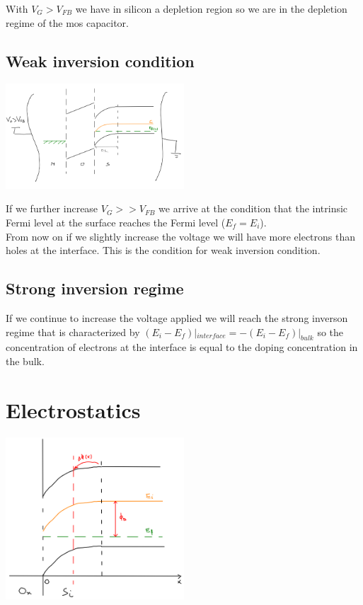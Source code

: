 With $V_G>V_{FB}$ we have in silicon a depletion region so we are in the depletion regime of the mos capacitor.
\subsection{Weak inversion condition}
\centering
\includegraphics[width=0.5\textwidth]{mos_weak.png}\\
\raggedright

If we further increase $V_G>>V_{FB}$ we arrive at the condition that the intrinsic Fermi level at the surface reaches the Fermi level ($E_f=E_i$).\\
From now on if we slightly increase the voltage we will have more electrons than holes at the interface. This is the condition for weak inversion condition.\\
\subsection{Strong inversion regime}
If we continue to increase the voltage applied we will reach the strong inverson regime that is characterized by $(E_i-E_f)|_{interface}=-(E_i-E_f)|_{bulk}$ so the concentration of electrons at the interface is equal to the doping concentration in the bulk.




\section{Electrostatics}
\centering
\includegraphics[width=0.5\textwidth]{mos_electrostatic.png}\\
\raggedright

